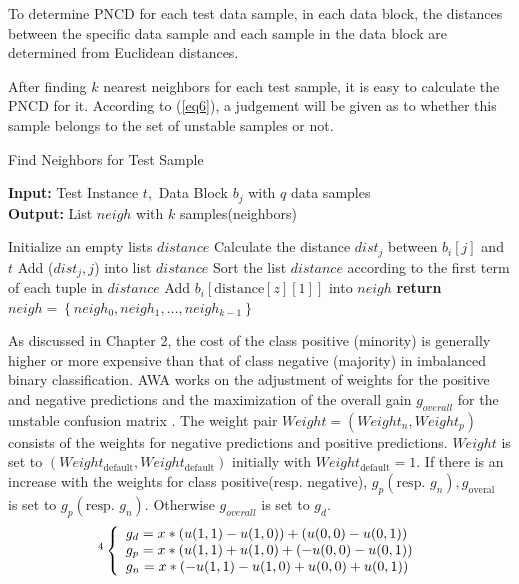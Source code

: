 To determine PNCD for each test data sample, in each data block, the distances between the specific data sample and each sample in the data block are determined from Euclidean distances.

After finding $k$ nearest neighbors for each test sample, it is easy to calculate the PNCD for it. According to (\ref{eq6}), a judgement will be given as to whether this sample belongs to the set of unstable samples or not. 
\begin{algorithm}[h]
    \caption{Find Neighbors for Test Sample}
    \label{algo2}
    \hspace*{0.02in} {\bf Input:} Test Instance $t,$ Data Block $b_{j}$ with $q$ data samples\\
    \hspace*{0.02in} {\bf Output:} List $neigh$ with $k$ samples(neighbors) 
    \begin{algorithmic}[1]
        \State Initialize an empty lists $distance$
            \State Calculate the distance $dist_{j}$ between $b_{i}[j]$ and $t$
            \State Add ($dist_{j}, j$) into list $distance$
        \EndFor
        \State Sort the list $distance$ according to the first term of each tuple in $distance$
            \State Add $b_{i}\left[\text{distance}\left[z\right]\left[1\right]\right]$ into $neigh$
        \EndFor
        \State \textbf{return} $neigh=\left\{neigh_{0}, neigh_{1}, \ldots, neigh_{k-1}\right\}$
    \end{algorithmic}
\end{algorithm}

As discussed in Chapter 2, the cost of the class positive (minority) is generally higher or more expensive than that of class negative (majority) in imbalanced binary classification. AWA works on the adjustment of weights for the positive and negative predictions and the maximization of the overall gain $g_{overall}$ for the unstable confusion matrix \cite{73}. The weight pair $Weight=\left(Weight_{n}, Weight_{p}\right)$ consists of the weights for negative predictions and positive predictions. $Weight$ is set to $\left(Weight_{\text {default}}, Weight_{\text {default}}\right)$ initially with $Weight_{\text{default}}=1$. If there is an increase with the weights for class positive(resp. negative), $g_{p}\left(\text{resp. } g_{n}\right), g_{\text {overal }}$ is set to $g_{p}\left(\text{resp. } g_{n}\right)$. Otherwise $g_{overall}$ is set to $g_d$.
\begin{equation}\label{eq7}\footnotemark[4]
    \left\{ 
        \begin{array}{l}
            g_{d}=x *(u(1,1)-u(1,0))+(u(0,0)-u(0,1))\\ 
            g_{p}=x *(u(1,1)+u(1,0)+(-u(0,0)-u(0,1))\\ 
            g_{n}=x *(-u(1,1)-u(1,0)+u(0,0)+u(0,1))
        \end{array}    
    \right.
\end{equation}

